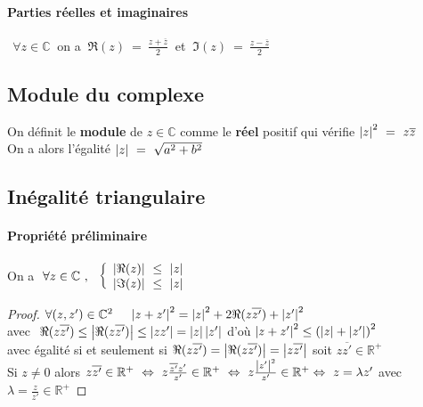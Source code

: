  \paragraph{Parties réelles et imaginaires} $~~\forall z\in\mathbb{C} ~$ on a $~\Re (z) ~=~ \frac{z+\overline{z}}{2} ~$ et $~\Im (z) ~=~ \frac{z-\overline{z}}{2}$
 \subsection{Module du complexe}
 On définit le \textbf{module} de $z\in\mathbb{C}$ comme le \textbf{réel} positif qui vérifie $\left\vert z \right\vert^2 ~=~ z\overline{z}$\\On a alors l'égalité $\left\vert z \right\vert ~=~ \sqrt{a^2 + b^2}$
 \subsection{Inégalité triangulaire}
 \paragraph{Propriété préliminaire} On a $~\forall z\in\mathbb{C} ~,~~ \left\{ \ar* \mc{\Re (z)} ~\leq ~ \mc{z} \\ \mc{\Im (z)} ~\leq ~ \mc{z} \ar\right.$\vspace*{5pt}\\
 \begin{proof}
 $\forall (z,z') \in\mathbb{C}^2  ~~~~ \left\vert z+z' \right\vert^2 = \left\vert z \right\vert^2 + 2\Re (z\overline{z'}) + \left\vert z' \right\vert^2$ \\ avec $~\Re (z\overline{z'}) \leq \left\vert \Re (z\overline{z'}) \right\vert \leq \left\vert zz' \right\vert = \left\vert z \right\vert\left\vert z' \right\vert$ d'où $\left\vert z+z' \right\vert^2 \leq \left(\left\vert z \right\vert + \left\vert z' \right\vert \right)^2$\vspace*{5pt}\\
 avec égalité si et seulement si $\Re (z\overline{z'}) = \left\vert \Re (z\overline{z'}) \right\vert = \left\vert z\overline{z'} \right\vert$ soit $z\overline{z'}\in\mathbb{R}^+$\vspace*{5pt}\\ Si $z\neq 0$ alors $z\overline{z'}\in\mathbb{R}^+ ~\Leftrightarrow ~ z\frac{\overline{z'} z'}{z'}\in\mathbb{R}^+ ~\Leftrightarrow ~ z\frac{\left\vert z' \right\vert^2}{z'} \in\mathbb{R}^+ \\ \Leftrightarrow ~z = \lambda z'$ avec $ \lambda = \frac{z}{z'} \in\mathbb{R}^+$
 \end{proof} ${}$\\
